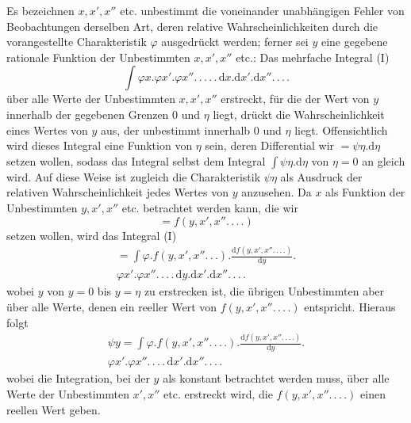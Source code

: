 Es bezeichnen \(x,x',x''\) etc. unbestimmt die voneinander unabhängigen Fehler von Beobachtungen derselben Art, deren relative Wahrscheinlichkeiten durch die vorangestellte Charakteristik \(\varphi\) ausgedrückt werden; ferner sei \(y\) eine gegebene rationale Funktion der Unbestimmten \(x,x',x''\) etc.: Das mehrfache Integral (I)
\[
\int\varphi x.\varphi x'.\varphi x''\mathord{.}\,\mathord{.}\,\mathord{.}\,\mathord{.}\,\mathord{.}\,\mathrm{d}x.\mathrm{d}x'.\mathrm{d}x''\mathord{.}\,\mathord{.}\,\mathord{.}\,\mathord{.}
\]
über alle Werte der Unbestimmten \(x,x',x''\) erstreckt, für die der Wert von \(y\) innerhalb der gegebenen Grenzen \(0\) und \(\eta\) liegt, drückt die Wahrscheinlichkeit eines Wertes von \(y\) aus, der unbestimmt innerhalb \(0\) und \(\eta\) liegt. Offensichtlich wird dieses Integral eine Funktion von \(\eta\) sein, deren Differential wir \(=\psi\eta.\mathrm{d}\eta\) setzen wollen, sodass das Integral selbst dem Integral \(\int\psi\eta.\mathrm{d}\eta\) von \(\eta=0\) an gleich wird. Auf diese Weise ist zugleich die Charakteristik \(\psi\eta\) als Ausdruck der relativen Wahrscheinlichkeit jedes Wertes von \(y\) anzusehen. Da \(x\) als Funktion der Unbestimmten \(y,x',x''\) etc. betrachtet werden kann, die wir
\[
=f(y,x',x''\mathord{.}\,\mathord{.}\,\mathord{.}\,\mathord{.})
\]
setzen wollen, wird das Integral (I)
\[
\begin{aligned}
=\int\varphi.f(y,x',x''\mathord{.}\,\mathord{.}\,\mathord{.}).\frac{\mathrm{d}f(y,x',x''\mathord{.}\,\mathord{.}\,\mathord{.}\,\mathord{.})}{\mathrm{d}y}.{}\\
\varphi x'.\varphi x''\mathord{.}\,\mathord{.}\,\mathord{.}\,\mathord{.}\,\mathrm{d}y.\mathrm{d}x'.\mathrm{d}x''\mathord{.}\,\mathord{.}\,\mathord{.}\,\mathord{.}
\end{aligned}
\]
wobei \(y\) von \(y=0\) bis \(y=\eta\) zu erstrecken ist, die übrigen Unbestimmten aber über alle Werte, denen ein reeller Wert von \(f(y,x',x''\mathord{.}\,\mathord{.}\,\mathord{.}\,\mathord{.})\) entspricht. Hieraus folgt
\[
\begin{aligned}
\psi y=\int\varphi.f(y,x',x''\mathord{.}\,\mathord{.}\,\mathord{.}\,\mathord{.}).\frac{\mathrm{d}f(y,x',x''\mathord{.}\,\mathord{.}\,\mathord{.}\,\mathord{.})}{\mathrm{d}y}.{}\\
\varphi x'.\varphi x''\mathord{.}\,\mathord{.}\,\mathord{.}\,\mathord{.}\,\mathrm{d}x'.\mathrm{d}x''\mathord{.}\,\mathord{.}\,\mathord{.}\,\mathord{.}
\end{aligned}
\]
wobei die Integration, bei der \(y\) als konstant betrachtet werden muss, über alle Werte der Unbestimmten \(x',x''\) etc. erstreckt wird, die \(f(y,x',x''\mathord{.}\,\mathord{.}\,\mathord{.}\,\mathord{.})\) einen reellen Wert geben.


